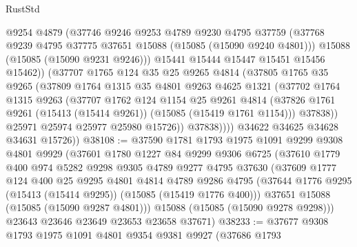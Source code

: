\begin{lexlean}{RustStd}
\begin{coremodule}
                  @9254
                  @4879
                  (@37746
                    @9246
                    @9253
                    @4789
                    @9230
                    @4795
                    @37759
                    (@37768 @9239 @4795 @37775 @37651 @15088 (@15085 (@15090 @9240 @4801)))
                    @15088
                    (@15085 (@15090 @9231 @9246)))
                  @15441
                  @15444
                  @15447
                  @15451
                  @15456
                  @15462))
              (@37707
                @1765
                @124
                @35
                @25
                @9265
                @4814
                (@37805
                  @1765
                  @35
                  @9265
                  (@37809
                    @1764
                    @1315
                    @35
                    @4801
                    @9263
                    @4625
                    @1321
                    (@37702
                      @1764
                      @1315
                      @9263
                      (@37707
                        @1762
                        @124
                        @1154
                        @25
                        @9261
                        @4814
                        (@37826 @1761 @9261 (@15413 (@15414 @9261)) (@15085 (@15419 @1761 @1154)))
                        @37838))
                    @25971
                    @25974
                    @25977
                    @25980
                    @15726))
                @37838))))
        @34622
        @34625
        @34628
        @34631
        @15726))
@38108 := @37590
    @1781
    @1793
    @1975
    @1091
    @9299
    @9308
    @4801
    @9929
    (@37601
      @1780
      @1227
      @84
      @9299
      @9306
      @6725
      (@37610
        @1779
        @400
        @974
        @5282
        @9298
        @9305
        @4789
        @9277
        @4795
        @37630
        (@37609
          @1777
          @124
          @400
          @25
          @9295
          @4801
          @4814
          @4789
          @9286
          @4795
          (@37644 @1776 @9295 (@15413 (@15414 @9295)) (@15085 (@15419 @1776 @400)))
          @37651
          @15088
          (@15085 (@15090 @9287 @4801)))
        @15088
        (@15085 (@15090 @9278 @9298)))
      @23643
      @23646
      @23649
      @23653
      @23658
      @37671)
@38233 := @37677
    @9308
    @1793
    @1975
    @1091
    @4801
    @9354
    @9381
    @9927
    (@37686
      @1793

\end{coremodule}
\end{lexlean}
